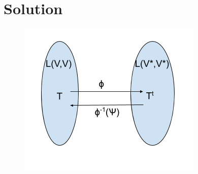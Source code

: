 \documentclass[journal,12pt,twocolumn]{IEEEtran}
\begin{document}
\section{Solution}
\begin{figure}[H]
\centering
\includegraphics[width=\columnwidth]{fig/transpose.png}
\end{figure}
\end{document}
